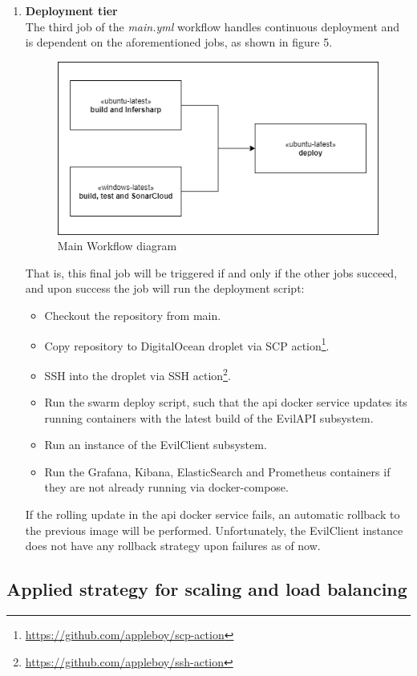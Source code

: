 \documentclass[report/main.tex]{subfiles}
\begin{document}
\begin{enumerate}
            
            \item \textbf{Deployment tier} \\
            The third job of the \textit{main.yml} workflow handles continuous deployment and is dependent on the aforementioned jobs, as shown in figure 5. 
            
            \begin{figure}[H]
            \centering
                \includegraphics[width=\textwidth/2]{report/images/MiniTwit-main-final.png}
                \caption{Main Workflow diagram}
            \label{fig:main_workflow}
            \end{figure}
            
            That is, this final job will be triggered if and only if the other jobs succeed, and upon success the job will run the deployment script:
            
            \begin{itemize}
                \item Checkout the repository from main. 
                \item Copy repository to DigitalOcean droplet via SCP action\footnote{\hyperlink{scp action}{https://github.com/appleboy/scp-action}}. 
                \item SSH into the droplet via SSH action\footnote{\hyperlink{ssh action}{https://github.com/appleboy/ssh-action}}.
                \item Run the swarm deploy script, such that the api docker service updates its running containers with the latest build of the EvilAPI subsystem. 
                \item Run an instance of the EvilClient subsystem. 
                \item Run the Grafana, Kibana, ElasticSearch and Prometheus containers if they are not already running via docker-compose.  
            \end{itemize}
            
            If the rolling update in the api docker service fails, an automatic rollback to the previous image will be performed. Unfortunately, the EvilClient instance does not have any rollback strategy upon failures as of now.  
            
        \end{enumerate}
        
        
        \subsection{Applied strategy for scaling and load balancing}
        
        
            
\end{document}
